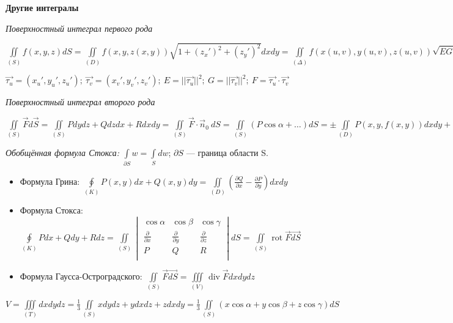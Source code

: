 \begin{center}
    \textbf{Другие интегралы}
\end{center}

\textit{Поверхностный интеграл первого рода}

$\displaystyle \iint\limits_{(S)}f(x, y, z)dS = \iint\limits_{(D)}f(x, y, z(x, y))\sqrt{1+(z_x')^2+(z_y')^2}dxdy = \iint\limits_{(\Delta)}f(x(u, v), y(u, v), z(u, v))\sqrt{EG - F^2}dudv$

$\displaystyle \vec{\tau_u} = (x_u',y_u',z_u'); ~\vec{\tau_v} = (x_v',y_v',z_v'); ~E = ||\vec{\tau_u}||^2; ~G = ||\vec{\tau_v}||^2; ~F = \vec{\tau_u} \cdot \vec{\tau_v}$

\vspace{1ex}
\textit{Поверхностный интеграл второго рода}

$\displaystyle \iint\limits_{(S)}\vec{F}d\vec{S} = \iint\limits_{(S)}Pdydz + Qdzdx + Rdxdy = \iint\limits_{(S)}\vec{F}\cdot\vec{n}_0~dS = \iint\limits_{(S)}(P\cos\alpha+\ldots)dS = \pm\iint\limits_{(D)}P(x,y,f(x,y))dxdy+\ldots$

\vspace{1ex}
\textit{Обобщённая формула Стокса:} 
$\displaystyle\int\limits_{\partial{S}}w = \int\limits_{S}dw$;
\hspace{1ex}$\partial{S}$ --- граница области S.
\vspace{-2.5ex}
\begin{itemize}
    \setlength\itemsep{-0.5em}
    \item Формула Грина: $\displaystyle\oint\limits_{(K)}P(x, y)dx + Q(x, y)dy = \iint\limits_{(D)}\left(\frac{\partial Q}{\partial x} - \frac{\partial P}{\partial y}\right)dxdy$
    \item Формула Стокса: $\displaystyle \oint\limits_{(K)} Pdx + Qdy + Rdz = \iint\limits_{(S)}\begin{vmatrix}
    \cos{\alpha} & \cos{\beta} & \cos{\gamma} \\
    \frac{\partial}{\partial{x}} & \frac{\partial}{\partial{y}} & \frac{\partial}{\partial{z}} \\
    P & Q & R \\
    \end{vmatrix}dS =  \iint\limits_{(S)} \operatorname{rot}\vec{F} \vec{dS}$ 
    \item Формула Гаусса-Остроградского: $\displaystyle  \iint\limits_{(S)} \vec{F}\vec{dS} = \iiint\limits_{(V)} \operatorname{div}\vec{F}dxdydz$ 
\end{itemize}

$\displaystyle V = \iiint\limits_{(T)}dxdydz = \frac{1}{3}\iint\limits_{(S)}xdydz+ydxdz+zdxdy = \frac{1}{3}\iint\limits_{(S)}(x\cos{\alpha} + y\cos{\beta} + z\cos{\gamma})dS$























